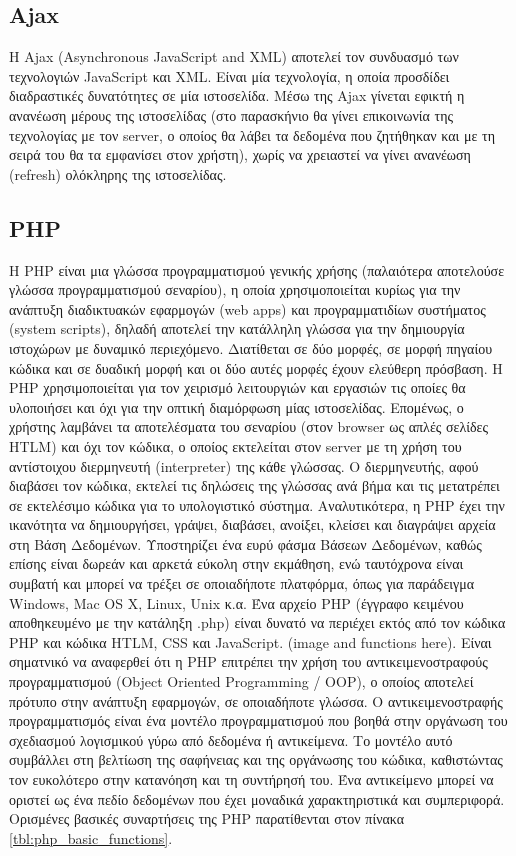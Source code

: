 \subsection{Ajax}
Η Ajax (Asynchronous JavaScript and XML) αποτελεί τον συνδυασμό των τεχνολογιών JavaScript και XML. Είναι μία τεχνολογία, η οποία προσδίδει διαδραστικές δυνατότητες σε μία ιστοσελίδα. Μέσω της Ajax γίνεται εφικτή η ανανέωση μέρους της ιστοσελίδας (στο παρασκήνιο θα γίνει επικοινωνία της τεχνολογίας με τον server, ο οποίος θα λάβει τα δεδομένα που ζητήθηκαν και με τη σειρά του θα τα εμφανίσει στον χρήστη), χωρίς να χρειαστεί να γίνει ανανέωση (refresh) ολόκληρης της ιστοσελίδας.

\subsection{PHP}
Η PHP είναι μια γλώσσα προγραμματισμού γενικής χρήσης (παλαιότερα αποτελούσε γλώσσα προγραμματισμού σεναρίου), η οποία χρησιμοποιείται κυρίως για την ανάπτυξη διαδικτυακών εφαρμογών (web apps) και προγραμματιδίων συστήματος (system scripts), δηλαδή αποτελεί την κατάλληλη γλώσσα για την δημιουργία ιστοχώρων με δυναμικό περιεχόμενο. Διατίθεται σε δύο μορφές, σε μορφή πηγαίου κώδικα και σε δυαδική μορφή και οι δύο αυτές μορφές έχουν ελεύθερη πρόσβαση. Η PHP χρησιμοποιείται για τον χειρισμό λειτουργιών και εργασιών τις οποίες θα υλοποιήσει και όχι για την οπτική διαμόρφωση μίας ιστοσελίδας. Επομένως, ο χρήστης λαμβάνει τα αποτελέσματα του σεναρίου (στον browser ως απλές σελίδες HTLM) και όχι τον κώδικα, ο οποίος εκτελείται στον server με τη χρήση του αντίστοιχου διερμηνευτή (interpreter) της κάθε γλώσσας. Ο διερμηνευτής, αφού διαβάσει τον κώδικα, εκτελεί τις δηλώσεις της γλώσσας ανά βήμα και τις μετατρέπει σε εκτελέσιμο κώδικα για το υπολογιστικό σύστημα. Αναλυτικότερα, η PHP έχει την ικανότητα να δημιουργήσει, γράψει, διαβάσει, ανοίξει, κλείσει και διαγράψει αρχεία στη Βάση Δεδομένων. Υποστηρίζει ένα ευρύ φάσμα Βάσεων Δεδομένων, καθώς επίσης είναι δωρεάν και αρκετά εύκολη στην εκμάθηση, ενώ ταυτόχρονα είναι συμβατή και μπορεί να τρέξει σε οποιαδήποτε πλατφόρμα, όπως για παράδειγμα Windows, Mac OS X, Linux, Unix κ.α. Ένα αρχείο PHP (έγγραφο κειμένου αποθηκευμένο με την κατάληξη .php) είναι δυνατό να περιέχει εκτός από τον κώδικα PHP και κώδικα HTLM, CSS και JavaScript. (image and functions here). Είναι σηματνικό να αναφερθεί ότι η PHP επιτρέπει την χρήση του αντικειμενοστραφούς προγραμματισμού (Object Oriented Programming / OOP), ο οποίος αποτελεί πρότυπο στην ανάπτυξη εφαρμογών, σε οποιαδήποτε γλώσσα. Ο αντικειμενοστραφής προγραμματισμός είναι ένα μοντέλο προγραμματισμού που βοηθά στην οργάνωση του σχεδιασμού λογισμικού γύρω από δεδομένα ή αντικείμενα. Το μοντέλο αυτό συμβάλλει στη βελτίωση της σαφήνειας και της οργάνωσης του κώδικα, καθιστώντας τον ευκολότερο στην κατανόηση και τη συντήρησή του. Ένα αντικείμενο μπορεί να οριστεί ως ένα πεδίο δεδομένων που έχει μοναδικά χαρακτηριστικά και συμπεριφορά. Ορισμένες βασικές συναρτήσεις της PHP παρατίθενται στον πίνακα \ref{tbl:php_basic_functions}.

